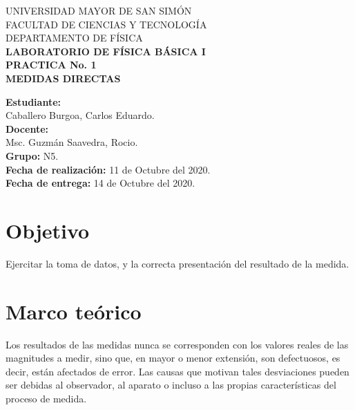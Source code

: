 \documentclass[letter,11pt]{article}
\newcommand{\blankpage}{
\newpage
\thispagestyle{empty}
\mbox{}
\newpage
}
\begin{document}
\begin{titlepage}
\begin{center}
{\Large UNIVERSIDAD MAYOR DE SAN SIMÓN}\\
\vspace*{0.15cm}
{\large FACULTAD DE CIENCIAS Y TECNOLOGÍA}\\
\vspace*{0.10cm}
DEPARTAMENTO DE FÍSICA\\
\vspace*{3.0cm}
{\Large \textbf{LABORATORIO DE FÍSICA BÁSICA I}}\\
\vspace*{0.3cm}
{\Large \textbf{PRACTICA No. 1}}\\
\vspace*{3.5cm}
{\Large \textbf{MEDIDAS DIRECTAS}}\\
\end{center}

\vspace*{7.4cm}
\leftskip=7.95cm
\noindent
\textbf{Estudiante:}\\
Caballero Burgoa, Carlos Eduardo.\\
\newline
\textbf{Docente:}\\
Msc. Guzmán Saavedra, Rocio.\\
\newline
\textbf{Grupo:} N5.\\
\textbf{Fecha de realización:} 11 de Octubre del 2020.\\
\textbf{Fecha de entrega:} 14 de Octubre del 2020.\\

\end{titlepage}

\blankpage

\section{Objetivo}
Ejercitar la toma de datos, y la correcta presentación del resultado de la
medida.

\section{Marco teórico}
Los resultados de las medidas nunca se corresponden con los valores reales de
las magnitudes a medir, sino que, en mayor o menor extensión, son defectuosos,
es decir, están afectados de error. Las causas que motivan tales desviaciones
pueden ser debidas al observador, al aparato o incluso a las propias
características del proceso de medida.
\end{document}
